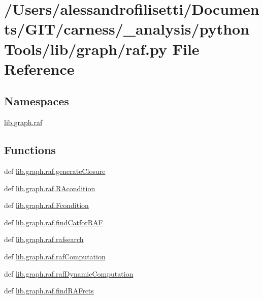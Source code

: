 \hypertarget{a00091}{\section{/\-Users/alessandrofilisetti/\-Documents/\-G\-I\-T/carness/\-\_\-analysis/python\-Tools/lib/graph/raf.py File Reference}
\label{a00091}
}
\subsection*{Namespaces}
\begin{DoxyCompactItemize}
\item 
\hyperlink{a00141}{lib.\-graph.\-raf}
\end{DoxyCompactItemize}
\subsection*{Functions}
\begin{DoxyCompactItemize}
\item 
def \hyperlink{a00141_a56510e9067d8a6c8f90847d6656ce709}{lib.\-graph.\-raf.\-generate\-Closure}
\item 
def \hyperlink{a00141_a9896a4198e08978afb80e86697f1bbd0}{lib.\-graph.\-raf.\-R\-Acondition}
\item 
def \hyperlink{a00141_a160a90fb55ff323fc86fcdc65b30b90f}{lib.\-graph.\-raf.\-Fcondition}
\item 
def \hyperlink{a00141_aaeb3a479f24daf493cc7052aef879d2c}{lib.\-graph.\-raf.\-find\-Catfor\-R\-A\-F}
\item 
def \hyperlink{a00141_a532a434a0b2fe187a3ff5a8319e4e3b4}{lib.\-graph.\-raf.\-rafsearch}
\item 
def \hyperlink{a00141_a3c9606e9d3274506955225eacf05877e}{lib.\-graph.\-raf.\-raf\-Computation}
\item 
def \hyperlink{a00141_a0b49d65e78e62c4ddd5022d4405f8286}{lib.\-graph.\-raf.\-raf\-Dynamic\-Computation}
\item 
def \hyperlink{a00141_aa4fb376eecb97a88efdb35aa15466c3b}{lib.\-graph.\-raf.\-find\-R\-A\-Frcts}
\end{DoxyCompactItemize}
